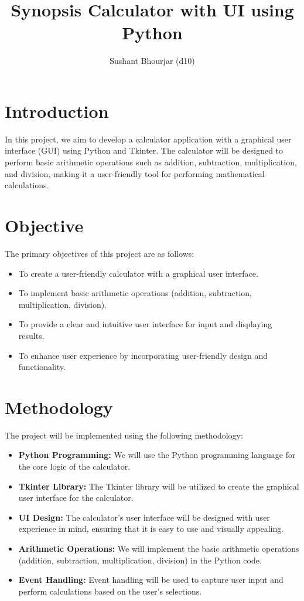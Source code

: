 \documentclass{article}
\title{\textbf{Synopsis Calculator with UI using Python}}
\author{Sushant Bhourjar (d10)}
\begin{document}
\maketitle

\section{Introduction}
In this project, we aim to develop a calculator application with a graphical user interface (GUI) using Python and Tkinter. The calculator will be designed to perform basic arithmetic operations such as addition, subtraction, multiplication, and division, making it a user-friendly tool for performing mathematical calculations.

\section{Objective}
The primary objectives of this project are as follows:
\begin{itemize}
    \item To create a user-friendly calculator with a graphical user interface.
    \item To implement basic arithmetic operations (addition, subtraction, multiplication, division).
    \item To provide a clear and intuitive user interface for input and displaying results.
    \item To enhance user experience by incorporating user-friendly design and functionality.
\end{itemize}

\section{Methodology}
The project will be implemented using the following methodology:

\begin{itemize}
    \item \textbf{Python Programming:} We will use the Python programming language for the core logic of the calculator.
    \item \textbf{Tkinter Library:} The Tkinter library will be utilized to create the graphical user interface for the calculator.
    \item \textbf{UI Design:} The calculator's user interface will be designed with user experience in mind, ensuring that it is easy to use and visually appealing.
    \item \textbf{Arithmetic Operations:} We will implement the basic arithmetic operations (addition, subtraction, multiplication, division) in the Python code.
    \item \textbf{Event Handling:} Event handling will be used to capture user input and perform calculations based on the user's selections.
\end{itemize}
\end{document}
